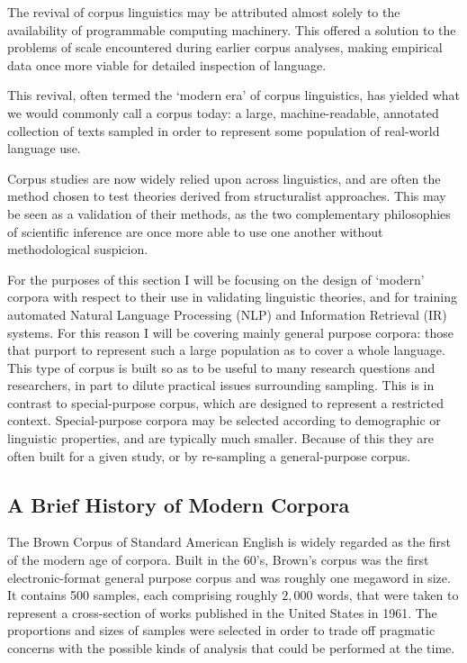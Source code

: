 The revival of corpus linguistics may be attributed almost solely to the availability of programmable computing machinery.  This offered a solution to the problems of scale encountered during earlier corpus analyses, making empirical data once more viable for detailed inspection of language.

This revival, often termed the `modern era' of corpus linguistics, has yielded what we would commonly call a corpus today: a large, machine-readable, annotated collection of texts sampled in order to represent some population of real-world language use.

Corpus studies are now widely relied upon across linguistics, and are often the method chosen to test theories derived from structuralist approaches.  This may be seen as a validation of their methods, as the two complementary philosophies of scientific inference are once more able to use one another without methodological suspicion.

For the purposes of this section I will be focusing on the design of `modern' corpora with respect to their use in validating linguistic theories, and for training automated Natural Language Processing (NLP) and Information Retrieval (IR) systems.  For this reason I will be covering mainly general purpose corpora: those that purport to represent such a large population as to cover a whole language.  This type of corpus is built so as to be useful to many research questions and researchers, in part to dilute practical issues surrounding sampling.  This is in contrast to special-purpose corpus, which are designed to represent a restricted context.  Special-purpose corpora may be selected according to demographic or linguistic properties, and are typically much smaller.  Because of this they are often built for a given study, or by re-sampling a general-purpose corpus.




\subsection{A Brief History of Modern Corpora}
The Brown Corpus of Standard American English\cite{francis1961brown}%
is widely regarded as the first of the modern age of corpora.  Built in the 60's, Brown's corpus was the first electronic-format general purpose corpus and was roughly one megaword in size.  %
It contains 500 samples, each comprising roughly $2,000$ words, that were taken to represent a cross-section of works published in the United States in 1961.  The proportions and sizes of samples were selected in order to trade off pragmatic concerns with the possible kinds of analysis that could be performed at the time.

